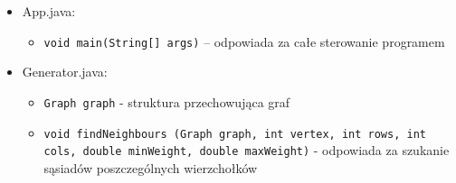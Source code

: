 \documentclass{article}
\begin{document}
\begin{itemize}
    

\item App.java:
    \begin{itemize}
        
    
    \item \texttt{\footnotesize void main(String[] args)} – odpowiada za całe sterowanie programem
    
    
    \end{itemize}
    
\item Generator.java:
    \begin{itemize}
    \item \texttt{\footnotesize Graph graph} - struktura przechowująca graf
    \item \texttt{\footnotesize void findNeighbours (Graph graph, int vertex, int rows, int cols, double minWeight, double maxWeight)} - odpowiada za szukanie sąsiadów poszczególnych wierzchołków
   

\end{itemize}
\end{itemize}
\end{document}
